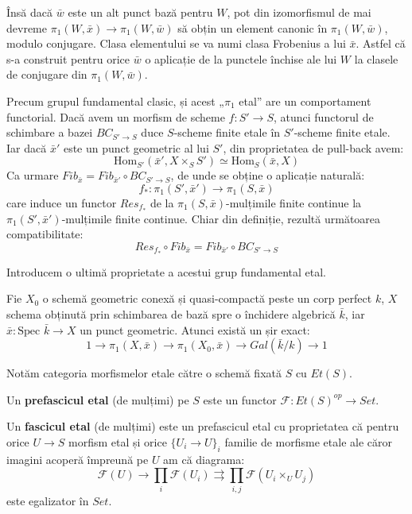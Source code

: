 \documentclass[13pt,openany,oneside]{book}
\begin{document}
Însă dacă $\bar{w}$ este un alt punct bază pentru $W$, pot din izomorfismul de mai devreme $ \pi_1(W,\bar{x}) \rightarrow \pi_1(W,\bar{w})$ să obțin un element canonic în $\pi_1(W,\bar{w})$, modulo conjugare. Clasa elementului se va numi clasa Frobenius a lui $\bar{x}$. Astfel că s-a construit pentru orice $\bar{w}$ o aplicație de la punctele închise ale lui $W$ la clasele de conjugare din $\pi_1(W,\bar{w})$.

Precum grupul fundamental clasic, și acest „$\pi_1$ etal” are un comportament functorial. Dacă avem un morfism de scheme $f: S' \rightarrow S$, atunci functorul de schimbare a bazei $BC_{S'\rightarrow S}$ duce $S$-scheme finite etale în $S'$-scheme finite etale. Iar dacă $\bar{x}'$ este un punct geometric al lui $S'$, din proprietatea de pull-back avem:
$$\text{Hom}_{S'}(\bar{x}',X \times_S S')\simeq \text{Hom}_S(\bar{x},X)$$
Ca urmare $Fib_{\bar{x}} = Fib_{\bar{x}'} \circ BC_{S'\rightarrow S}$, de unde se obține o aplicație naturală:
$$f_* : \pi_1(S',\bar{x}') \rightarrow \pi_1(S,\bar{x})$$
care induce un functor $Res_{f_*}$ de la $\pi_1(S,\bar{x})$-mulțimile finite continue la $\pi_1(S',\bar{x}')$-mulțimile finite continue. Chiar din definiție, rezultă următoarea compatibilitate:
$$Res_{f_*} \circ Fib_{\bar{x}} = Fib_{\bar{x}'} \circ BC_{S'\rightarrow S}$$

Introducem o ultimă proprietate a acestui grup fundamental etal.

\begin{teo}
Fie $X_0$ o schemă geometric conexă și quasi-compactă peste un corp perfect $k$, $X$ schema obținută prin schimbarea de bază spre o închidere algebrică $\bar{k}$, iar $\bar{x} : \text{Spec }\bar{k} \rightarrow X$ un punct geometric. Atunci există un șir exact:
$$1 \rightarrow \pi_1(X,\bar{x}) \rightarrow \pi_1(X_0,\bar{x}) \rightarrow Gal(\bar{k}/k) \rightarrow 1$$
\end{teo}

Notăm categoria morfismelor etale către o schemă fixată $S$ cu $Et(S)$.

\begin{defi}
Un {\bf prefascicul etal} (de mulțimi) pe $S$ este un functor $\mathcal{F} : Et(S)^{op} \rightarrow Set$.
\end{defi}

\begin{defi}
Un {\bf fascicul etal} (de mulțimi) este un prefascicul etal cu proprietatea că pentru orice $U \rightarrow S$ morfism etal și orice $\{U_i \rightarrow U\}_i$ familie de morfisme etale ale căror imagini acoperă împreună pe $U$ am că diagrama:
$$\mathcal{F}(U) \rightarrow \prod_i \mathcal{F}(U_i) \rightrightarrows \prod_{i,j} \mathcal{F}(U_i \times_U U_j)$$
este egalizator în $Set$.
\end{defi}
\end{document}
